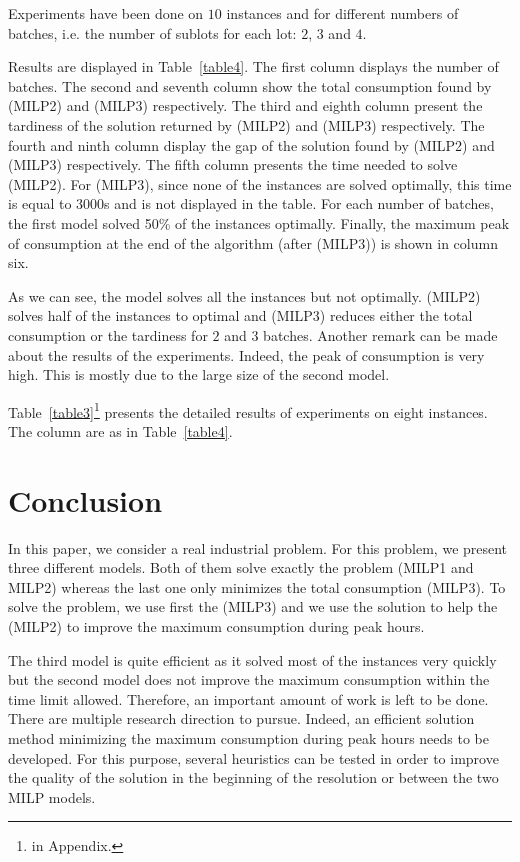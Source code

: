 Experiments have been done on $10$ instances and for different numbers
of batches, i.e. the number of sublots for each lot: $2$, $3$ and
$4$. 

Results are displayed in Table~\ref{table4}. The first column 
displays the number of batches. The second and seventh column show the
total consumption found by (MILP2) and (MILP3) respectively. The third
and eighth column present the tardiness of the solution returned by
(MILP2) and (MILP3) respectively. The fourth and ninth column display
the gap of the solution found by (MILP2) and (MILP3)
respectively. The fifth column presents the time needed to solve
(MILP2). For (MILP3), since none of the instances are solved
optimally, this time is equal to 3000s and is not displayed in the
table. For each number of batches, the first model solved 50\% of the
instances optimally. Finally, the maximum peak of consumption at the end of the
algorithm (after (MILP3)) is shown in column six.


As we can see, the model solves all the instances but not
optimally. (MILP2) solves half of the instances to optimal and (MILP3)
reduces either the total consumption or the tardiness for $2$ and $3$
batches. Another remark can be made about the results of the
experiments. Indeed, the peak of consumption is very high. This
is mostly due to the large size of the second model.

Table~\ref{table3}\footnote{in Appendix.} presents the detailed
results of experiments on eight instances. The column are as in
Table~\ref{table4}.
 
\section{Conclusion}
\label{sec:concl}

In this paper, we consider a real industrial problem. For this
problem, we present three different models. Both of them solve exactly
the problem (MILP1 and MILP2) whereas the last one only minimizes the
total consumption (MILP3). To solve the problem, we use first the
(MILP3) and we use the solution to help the (MILP2) to improve the
maximum consumption during peak hours.

The third model is quite efficient as it solved most of the instances very quickly but the second model does not improve the maximum consumption within
the time limit allowed. Therefore, an important amount of work is left
to be done. There are multiple research direction to pursue. Indeed,
an efficient solution method minimizing the maximum consumption during
peak hours needs to be developed. For this purpose, several heuristics
can be tested in order to improve the quality of the solution in the
beginning of the resolution or between the two MILP models.

